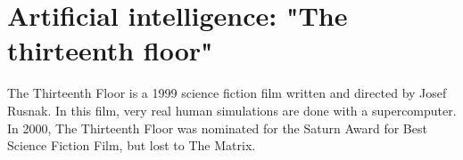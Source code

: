  
 
 
 
  
  
     
 \section*{Artificial intelligence: "The thirteenth floor"} 
 The Thirteenth Floor is a 1999 science fiction film written and directed by Josef Rusnak. 
 In this film, very real human simulations are done with a supercomputer. 
 In 2000, The Thirteenth Floor was nominated for the Saturn Award for Best Science Fiction Film, but lost to The Matrix.
 
